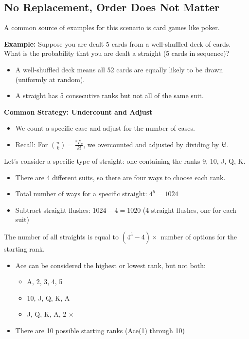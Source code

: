 \documentclass{article}
\begin{document}
\subsection*{No Replacement, Order Does Not Matter}

A common source of examples for this scenario is card games like poker.

\vspace{0.3cm}

\noindent
\textbf{Example:} Suppose you are dealt 5 cards from a well-shuffled deck of cards. What is the probability that you are dealt a straight (5 cards in sequence)?

\begin{itemize}
    \item A well-shuffled deck means all 52 cards are equally likely to be drawn (uniformly at random).
    \item A straight has 5 consecutive ranks but not all of the same suit.
\end{itemize}

\vspace{0.3cm}

\noindent
\textbf{Common Strategy: Undercount and Adjust}
\begin{itemize}
    \item We count a specific case and adjust for the number of cases.
    \item Recall: For $\binom{n}{k} = \frac{{}^nP_k}{k!}$, we overcounted and adjusted by dividing by $k!$.
\end{itemize}

\vspace{0.3cm}

\noindent
Let's consider a specific type of straight: one containing the ranks 9, 10, J, Q, K.

\begin{itemize}
    \item There are 4 different suits, so there are four ways to choose each rank.
    \item Total number of ways for a specific straight: $4^5 = 1024$
    \item Subtract straight flushes: $1024 - 4 = 1020$ (4 straight flushes, one for each suit)
\end{itemize}

The number of all straights is equal to $(4^5-4) \times$ number of options for the starting rank.

\begin{itemize}
    \item Ace can be considered the highest or lowest rank, but not both:
    \begin{itemize}
        \item A, 2, 3, 4, 5 \checkmark
        \item 10, J, Q, K, A \checkmark
        \item J, Q, K, A, 2 $\times$
    \end{itemize}
    \item There are 10 possible starting ranks (Ace(1) through 10)
\end{itemize}
\end{document}
